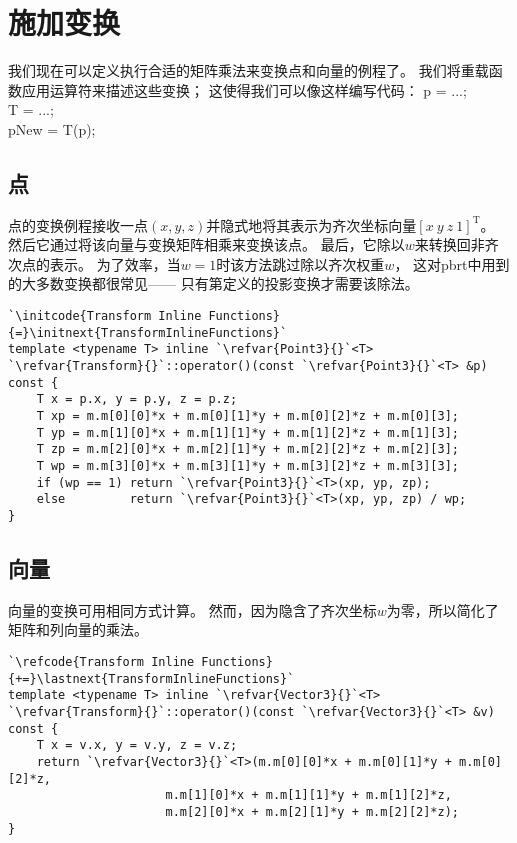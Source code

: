 \section{施加变换}\label{sec:施加变换}

我们现在可以定义执行合适的矩阵乘法来变换点和向量的例程了。
我们将重载函数应用运算符来描述这些变换；
这使得我们可以像这样编写代码：
{\ttfamily\indent {} p = ...;\\}
{\ttfamily\indent {} T = ...;\\}
{\ttfamily\indent {} pNew = T(p);}

\subsection{点}\label{sub:点}
点的变换例程接收一点$(x,y,z)$并隐式地将其表示为齐次坐标向量$[x\ y\ z\ 1]^\mathrm{T}$。
然后它通过将该向量与变换矩阵相乘来变换该点。
最后，它除以$w$来转换回非齐次点的表示。
为了效率，当$w=1$时该方法跳过除以齐次权重$w$，
这对pbrt中用到的大多数变换都很常见——
只有第定义的投影变换才需要该除法。
\begin{lstlisting}
`\initcode{Transform Inline Functions}{=}\initnext{TransformInlineFunctions}`
template <typename T> inline `\refvar{Point3}{}`<T>
`\refvar{Transform}{}`::operator()(const `\refvar{Point3}{}`<T> &p) const {
    T x = p.x, y = p.y, z = p.z;
    T xp = m.m[0][0]*x + m.m[0][1]*y + m.m[0][2]*z + m.m[0][3];
    T yp = m.m[1][0]*x + m.m[1][1]*y + m.m[1][2]*z + m.m[1][3];
    T zp = m.m[2][0]*x + m.m[2][1]*y + m.m[2][2]*z + m.m[2][3];
    T wp = m.m[3][0]*x + m.m[3][1]*y + m.m[3][2]*z + m.m[3][3];
    if (wp == 1) return `\refvar{Point3}{}`<T>(xp, yp, zp);
    else         return `\refvar{Point3}{}`<T>(xp, yp, zp) / wp;
}
\end{lstlisting}

\subsection{向量}\label{sub:向量}
向量的变换可用相同方式计算。
然而，因为隐含了齐次坐标$w$为零，所以简化了矩阵和列向量的乘法。
\begin{lstlisting}
`\refcode{Transform Inline Functions}{+=}\lastnext{TransformInlineFunctions}`
template <typename T> inline `\refvar{Vector3}{}`<T>
`\refvar{Transform}{}`::operator()(const `\refvar{Vector3}{}`<T> &v) const {
    T x = v.x, y = v.y, z = v.z;
    return `\refvar{Vector3}{}`<T>(m.m[0][0]*x + m.m[0][1]*y + m.m[0][2]*z,
                      m.m[1][0]*x + m.m[1][1]*y + m.m[1][2]*z,
                      m.m[2][0]*x + m.m[2][1]*y + m.m[2][2]*z);
}
\end{lstlisting}

